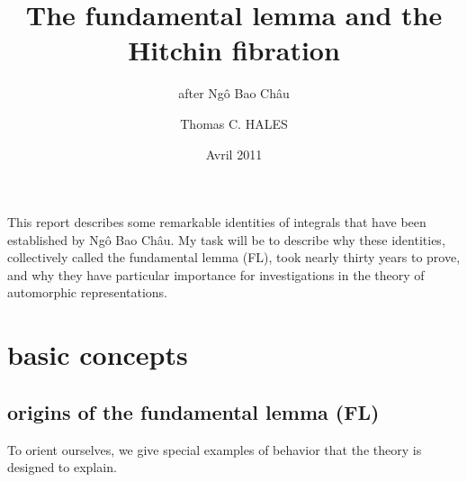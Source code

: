 \documentclass[brochure,english,12pt]{bourbaki}
\date{Avril 2011}
\title{The fundamental lemma and the Hitchin fibration}
\subtitle{after Ng\^o Bao Ch\^au}
\author{Thomas C. HALES}
\begin{document}
\maketitle



{


}

\bigskip



This report describes some remarkable identities of integrals that have
been established by Ng\^o Bao Ch\^au.   My task will be to describe
why these identities, collectively called the fundamental lemma (FL),
took nearly thirty years to prove, and why they have particular
importance for investigations in the theory of automorphic
representations.



\section{basic concepts}

\subsection{origins of the fundamental lemma (FL)}\label{sec:origin}


To orient ourselves, we give special examples of
behavior that the theory is designed to explain.
\end{document}
